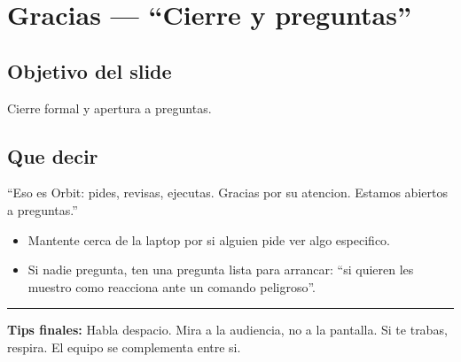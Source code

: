 \documentclass[12pt,a4paper]{article}
\begin{document}
\section{Gracias --- ``Cierre y preguntas''}
\subsection{Objetivo del slide}
Cierre formal y apertura a preguntas.

\subsection{Que decir}
\begin{frasebox}
``Eso es Orbit: pides, revisas, ejecutas. Gracias por su atencion. Estamos abiertos a preguntas.''
\end{frasebox}

\begin{itemize}
  \item Mantente cerca de la laptop por si alguien pide ver algo especifico.
  \item Si nadie pregunta, ten una pregunta lista para arrancar: ``si quieren les muestro como reacciona ante un comando peligroso''.
\end{itemize}

\vspace{1em}
\hrule
\vspace{0.6em}

\begin{center}
  \small\textcolor{grisOscuro}{
    \textbf{Tips finales:}
    Habla despacio. Mira a la audiencia, no a la pantalla.
    Si te trabas, respira. El equipo se complementa entre si.
  }
\end{center}
\end{document}
